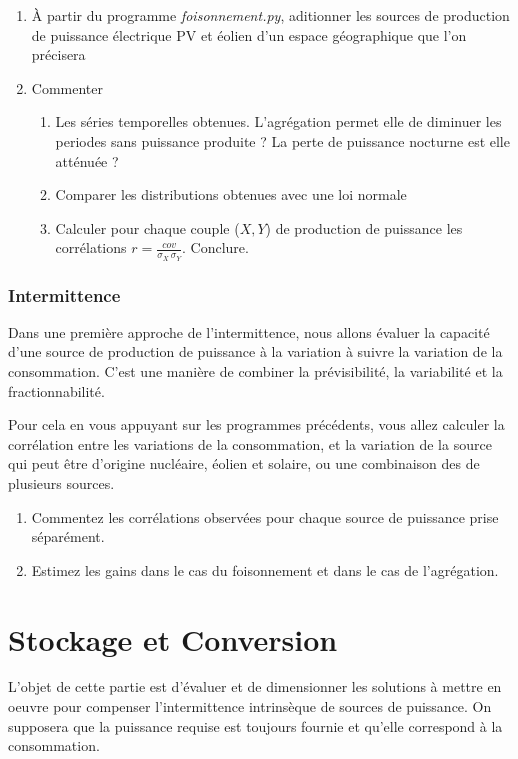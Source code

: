 \documentclass[12pt,a4,french]{article}
\newcommand{\tmtextit}[1]{{\itshape{#1}}}
\begin{document}
\begin{enumerate}
  \item À partir du programme \tmtextit{foisonnement.py}, aditionner les
  sources de production de puissance électrique PV et éolien d'un espace géographique que l'on précisera 
  
  \item Commenter
  \begin{enumerate}
    \item Les séries temporelles obtenues. L'agrégation permet elle de
    diminuer les periodes sans puissance produite ? La perte de puissance
    nocturne est elle atténuée ?
    
    \item Comparer les distributions obtenues avec une loi normale
    
    \item Calculer pour chaque couple ($X,Y$) de production de puissance les corrélations $r=\frac{cov}{\sigma_X \, \sigma_Y}$. Conclure.
    
  \end{enumerate}
\end{enumerate}

\section{Intermittence}

Dans une première approche de l'intermittence, nous allons évaluer la
capacité d'une source de production de puissance à la variation à suivre la variation de la consommation. C'est une manière de combiner la prévisibilité, la variabilité et la fractionnabilité.

Pour cela en vous appuyant sur les programmes précédents, vous allez calculer la corrélation entre les variations de la consommation, et la variation de la source qui peut être d'origine nucléaire, éolien et solaire, ou une combinaison des de plusieurs sources.

\begin{enumerate}
	\item Commentez les corrélations observées pour chaque source de puissance prise séparément.
	\item Estimez les gains dans le cas du foisonnement et dans le cas de l'agrégation.
\end{enumerate}



\part{Stockage et Conversion}
L'objet de cette partie est d'évaluer et de dimensionner les solutions à mettre en oeuvre pour compenser l'intermittence intrinsèque de sources de puissance. On supposera que la puissance requise est toujours fournie et qu'elle correspond à la consommation.
\end{document}
